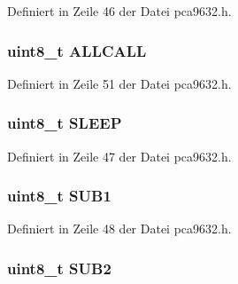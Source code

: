 Definiert in Zeile 46 der Datei pca9632.\+h.

\hypertarget{structpca9632__mode1_a3b132e9bc22066a1b609998caba7f94c}{}
\subsubsection[{A\+L\+L\+C\+A\+L\+L}]{\setlength{\rightskip}{0pt plus 5cm}uint8\+\_\+t A\+L\+L\+C\+A\+L\+L}\label{structpca9632__mode1_a3b132e9bc22066a1b609998caba7f94c}


Definiert in Zeile 51 der Datei pca9632.\+h.

\hypertarget{structpca9632__mode1_a05c807e11fc79c83555f4ffa9c615931}{}
\subsubsection[{S\+L\+E\+E\+P}]{\setlength{\rightskip}{0pt plus 5cm}uint8\+\_\+t S\+L\+E\+E\+P}\label{structpca9632__mode1_a05c807e11fc79c83555f4ffa9c615931}


Definiert in Zeile 47 der Datei pca9632.\+h.

\hypertarget{structpca9632__mode1_ac083d3b48e6031d3d2f8ad9364979f8a}{}
\subsubsection[{S\+U\+B1}]{\setlength{\rightskip}{0pt plus 5cm}uint8\+\_\+t S\+U\+B1}\label{structpca9632__mode1_ac083d3b48e6031d3d2f8ad9364979f8a}


Definiert in Zeile 48 der Datei pca9632.\+h.

\hypertarget{structpca9632__mode1_af120064ca23de43baa710af2e393a464}{}
\subsubsection[{S\+U\+B2}]{\setlength{\rightskip}{0pt plus 5cm}uint8\+\_\+t S\+U\+B2}\label{structpca9632__mode1_af120064ca23de43baa710af2e393a464}


